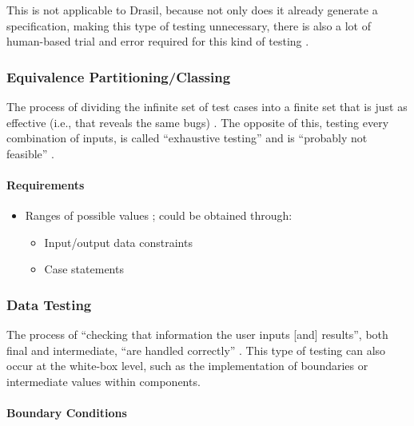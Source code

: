 This is not applicable to Drasil, because not only does it already generate a
specification, making this type of testing unnecessary, there is also a lot of
human-based trial and error required for this kind of testing
\citep{june_11_meeting}.

\subsubsection{Equivalence Partitioning/Classing \citep[pp.~67-69]{Patton2006}}

The process of dividing the infinite set of test cases into a finite set that is
just as effective (i.e., that reveals the same bugs) \citep[p.~67]{Patton2006}.
The opposite of this, testing every combination of inputs, is called
``exhaustive testing'' and is ``probably not feasible''
\citep[p.~461]{PetersAndPedrycz2000}.

\paragraph{Requirements}
\begin{itemize}
      \item Ranges of possible values \citep[p.~67]{Patton2006};
            could be obtained through:
            \begin{itemize}
                  \item Input/output data constraints
                  \item Case statements
            \end{itemize}
\end{itemize}

\subsubsection{Data Testing \citep[pp.~70-79]{Patton2006}}

The process of ``checking that information the user inputs [and] results'',
both final and intermediate, ``are handled correctly''
\citep[p.~70]{Patton2006}. This type of testing can also occur at the
white-box level, such as the implementation of boundaries
\citep[p.~431]{vanVliet2000} or intermediate values within
components.

\paragraph{Boundary Conditions \citep[pp.~70-74]{Patton2006}}

